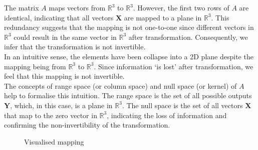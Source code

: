 The matrix \( A \) maps vectors from \( \mathbb{R}^3 \) to \( \mathbb{R}^3 \). However, the first two rows of \( A \) are identical, indicating that all vectors \( \mathbf{X} \) are mapped to a plane in \( \mathbb{R}^3 \). This redundancy suggests that the mapping is not one-to-one since different vectors in \( \mathbb{R}^3 \) could result in the same vector in \( \mathbb{R}^3 \) after transformation. Consequently, we infer that the transformation is not invertible.\\

In an intuitive sense, the elements have been collapse into a 2D plane despite the mapping being from \( \mathbb{R}^3 \) to \( \mathbb{R}^3 \). Since information `is lost' after transformation, we feel that this mapping is not invertible.\\

The concepts of range space (or column space) and null space (or kernel) of \( A \) help to formalise this intuition. The range space is the set of all possible outputs \( \mathbf{Y} \), which, in this case, is a plane in \( \mathbb{R}^3 \). The null space is the set of all vectors \( \mathbf{X} \) that map to the zero vector in \( \mathbb{R}^3 \), indicating the loss of information and confirming the non-invertibility of the transformation.


\begin{figure}[H]
\begin{center}
\end{center}
\caption{Visualised mapping}
\label{fig:mapping_linear_transform}

\end{figure}

